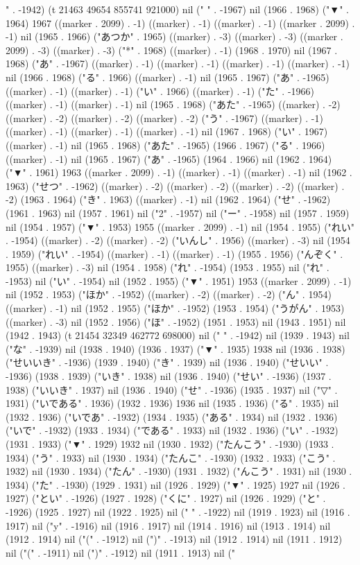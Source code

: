 " . -1942) (t 21463 49654 855741 921000) nil (" " . -1967) nil (1966 . 1968) ("▼" . 1964) 1967 ((marker . 2099) . -1) ((marker) . -1) ((marker) . -1) ((marker . 2099) . -1) nil (1965 . 1966) ("あつか" . 1965) ((marker) . -3) ((marker) . -3) ((marker . 2099) . -3) ((marker) . -3) ("*" . 1968) ((marker) . -1) (1968 . 1970) nil (1967 . 1968) ("あ" . -1967) ((marker) . -1) ((marker) . -1) ((marker) . -1) ((marker) . -1) nil (1966 . 1968) ("る" . 1966) ((marker) . -1) nil (1965 . 1967) ("あ" . -1965) ((marker) . -1) ((marker) . -1) ("い" . 1966) ((marker) . -1) ("た" . -1966) ((marker) . -1) ((marker) . -1) nil (1965 . 1968) ("あた" . -1965) ((marker) . -2) ((marker) . -2) ((marker) . -2) ((marker) . -2) ("う" . -1967) ((marker) . -1) ((marker) . -1) ((marker) . -1) ((marker) . -1) nil (1967 . 1968) ("い" . 1967) ((marker) . -1) nil (1965 . 1968) ("あた" . -1965) (1966 . 1967) ("る" . 1966) ((marker) . -1) nil (1965 . 1967) ("あ" . -1965) (1964 . 1966) nil (1962 . 1964) ("▼" . 1961) 1963 ((marker . 2099) . -1) ((marker) . -1) ((marker) . -1) nil (1962 . 1963) ("せつ" . -1962) ((marker) . -2) ((marker) . -2) ((marker) . -2) ((marker) . -2) (1963 . 1964) ("き" . 1963) ((marker) . -1) nil (1962 . 1964) ("せ" . -1962) (1961 . 1963) nil (1957 . 1961) nil ("2" . -1957) nil ("ー" . -1958) nil (1957 . 1959) nil (1954 . 1957) ("▼" . 1953) 1955 ((marker . 2099) . -1) nil (1954 . 1955) ("れい" . -1954) ((marker) . -2) ((marker) . -2) ("いんし" . 1956) ((marker) . -3) nil (1954 . 1959) ("れい" . -1954) ((marker) . -1) ((marker) . -1) (1955 . 1956) ("んぞく" . 1955) ((marker) . -3) nil (1954 . 1958) ("れ" . -1954) (1953 . 1955) nil ("れ" . -1953) nil ("い" . -1954) nil (1952 . 1955) ("▼" . 1951) 1953 ((marker . 2099) . -1) nil (1952 . 1953) ("ほか" . -1952) ((marker) . -2) ((marker) . -2) ("ん" . 1954) ((marker) . -1) nil (1952 . 1955) ("ほか" . -1952) (1953 . 1954) ("うがん" . 1953) ((marker) . -3) nil (1952 . 1956) ("ほ" . -1952) (1951 . 1953) nil (1943 . 1951) nil (1942 . 1943) (t 21454 32349 462772 698000) nil (" " . -1942) nil (1939 . 1943) nil ("な" . -1939) nil (1938 . 1940) (1936 . 1937) ("▼" . 1935) 1938 nil (1936 . 1938) ("せいいき" . -1936) (1939 . 1940) ("き" . 1939) nil (1936 . 1940) ("せいい" . -1936) (1938 . 1939) ("いき" . 1938) nil (1936 . 1940) ("せい" . -1936) (1937 . 1938) ("いいき" . 1937) nil (1936 . 1940) ("せ" . -1936) (1935 . 1937) nil ("▽" . 1931) ("いである" . 1936) (1932 . 1936) 1936 nil (1935 . 1936) ("る" . 1935) nil (1932 . 1936) ("いであ" . -1932) (1934 . 1935) ("ある" . 1934) nil (1932 . 1936) ("いで" . -1932) (1933 . 1934) ("である" . 1933) nil (1932 . 1936) ("い" . -1932) (1931 . 1933) ("▼" . 1929) 1932 nil (1930 . 1932) ("たんこう" . -1930) (1933 . 1934) ("う" . 1933) nil (1930 . 1934) ("たんこ" . -1930) (1932 . 1933) ("こう" . 1932) nil (1930 . 1934) ("たん" . -1930) (1931 . 1932) ("んこう" . 1931) nil (1930 . 1934) ("た" . -1930) (1929 . 1931) nil (1926 . 1929) ("▼" . 1925) 1927 nil (1926 . 1927) ("とい" . -1926) (1927 . 1928) ("くに" . 1927) nil (1926 . 1929) ("と" . -1926) (1925 . 1927) nil (1922 . 1925) nil (" " . -1922) nil (1919 . 1923) nil (1916 . 1917) nil ("y" . -1916) nil (1916 . 1917) nil (1914 . 1916) nil (1913 . 1914) nil (1912 . 1914) nil ("(" . -1912) nil (")" . -1913) nil (1912 . 1914) nil (1911 . 1912) nil ("(" . -1911) nil (")" . -1912) nil (1911 . 1913) nil ("
